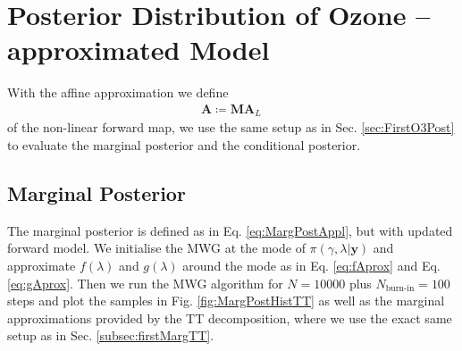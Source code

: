 \section{Posterior Distribution of Ozone -- approximated Model}
With the affine approximation we define
\begin{align}
	\bm{A}  \coloneqq \bm{M A}_L \, 
\end{align}
of the non-linear forward map, we use the same setup as in Sec. \ref{sec:FirstO3Post} to evaluate the marginal posterior and the conditional posterior.

\subsection{Marginal Posterior}
The marginal posterior is defined as in Eq. \ref{eq:MargPostAppl}, but with updated forward model.
We initialise the MWG at the mode of $\pi(\gamma, \lambda | \bm{y})$ and approximate $f(\lambda)$ and $g(\lambda)$ around the mode as in Eq. \ref{eq:fAprox} and Eq. \ref{eq:gAprox}.
Then we run the MWG algorithm for $N = 10000$ plus $N_{\text{burn-in}} = 100$ steps and plot the samples in Fig. \ref{fig:MargPostHistTT} as well as the marginal approximations provided by the TT decomposition, where we use the exact same setup as in Sec. \ref{subsec:firstMargTT}.

